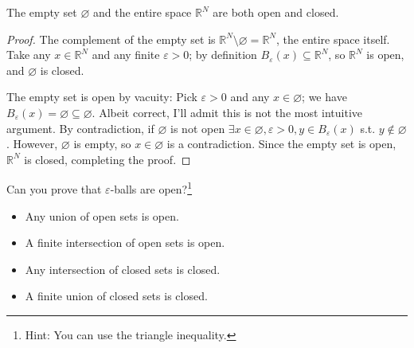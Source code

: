 \documentclass{article}
\begin{document}
\begin{claim}
  The empty set $\varnothing$ and the entire space $\mathbb{R}^N$ are both open and closed.
\end{claim}

\begin{proof}
  The complement of  the empty set is $\mathbb{R}^N \setminus \varnothing = \mathbb{R}^N$, the entire space itself. Take any $x \in \mathbb{R}^N$ and any finite $\varepsilon > 0$; by definition $B_{\varepsilon}(x) \subseteq \mathbb{R}^N$, so $\mathbb{R}^N$ is open, and $\varnothing$ is closed.
  
  The empty set is open by vacuity: Pick $\varepsilon > 0$ and any $x \in \varnothing$; we have $B_{\varepsilon}(x) = \varnothing \subseteq \varnothing$. Albeit correct, I'll admit this is not  the most intuitive argument. By contradiction, if $\varnothing$ is not open $\exists x \in \varnothing, \varepsilon > 0, y \in B_{\varepsilon}(x)$ s.t. $y \notin \varnothing$. However, $\varnothing$ is empty, so $x \in \varnothing$ is a contradiction. Since the empty set is open, $\mathbb{R}^N$ is closed, completing the proof.
\end{proof}

Can you prove that $\varepsilon$-balls are open?\footnote{Hint: You can use the triangle inequality.}
\begin{claim}
  \begin{itemize}[label=$\bullet$]
    \item Any union of open sets is open.

    \item A finite intersection of open sets is open.

    \item Any intersection of closed sets is closed.

    \item A finite union of closed sets is closed.
  \end{itemize}
\end{claim}
\end{document}
